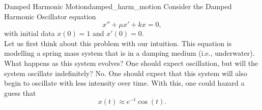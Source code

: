         \begin{ex}{Damped Harmonic Motion}{damped_harm_motion}
        Consider the Damped Harmonic Oscillator equation
        \[
        x'' +\mu x' + kx = 0,
        \]
        with initial data $x(0)=1$ and $x'(0)=0$.\\ 
        
        Let us first think about this problem with our intuition.  This equation is modelling a spring mass system that is in a damping medium (i.e., underwater).  What happens as this system evolves?  One should expect oscillation, but will the system oscillate indefinitely? No.  One should expect that this system will also begin to oscillate with less intensity over time.  With this, one could hazard a guess that
        \[
        x(t) \approx e^{-t}\cos(t).
        \]
        

\end{ex}
